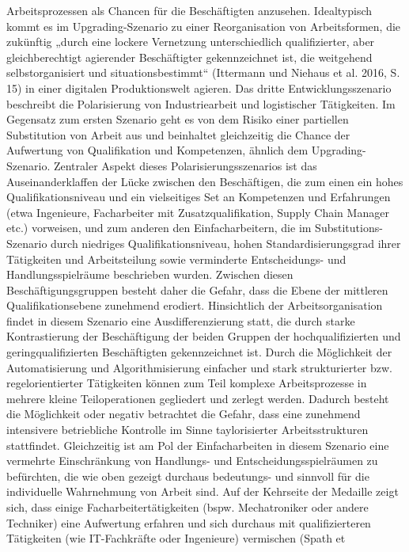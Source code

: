 Arbeitsprozessen als Chancen für die Beschäftigten
anzusehen. Idealtypisch kommt es im Upgrading-Szenario zu einer Reorganisation von Arbeitsformen, die
zukünftig „durch eine lockere Vernetzung unterschiedlich qualifizierter, aber gleichberechtigt agierender Beschäftigter gekennzeichnet ist, die weitgehend
selbstorganisiert und situationsbestimmt“ (Ittermann
und Niehaus et al. 2016, S. 15) in einer digitalen Produktionswelt agieren.
Das dritte Entwicklungsszenario beschreibt die
Polarisierung von Industriearbeit und logistischer Tätigkeiten. Im Gegensatz zum ersten Szenario geht es
von dem Risiko einer partiellen Substitution von Arbeit aus und beinhaltet gleichzeitig die Chance der
Aufwertung von Qualifikation und Kompetenzen,
ähnlich dem Upgrading-Szenario. Zentraler Aspekt
dieses Polarisierungsszenarios ist das Auseinanderklaffen der Lücke zwischen den Beschäftigen, die zum
einen ein hohes Qualifikationsniveau und ein vielseitiges Set an Kompetenzen und Erfahrungen (etwa Ingenieure, Facharbeiter mit Zusatzqualifikation, Supply
Chain Manager etc.) vorweisen, und zum anderen den
Einfacharbeitern, die im Substitutions-Szenario durch
niedriges Qualifikationsniveau, hohen Standardisierungsgrad ihrer Tätigkeiten und Arbeitsteilung sowie
verminderte Entscheidungs- und Handlungsspielräume beschrieben wurden. Zwischen diesen Beschäftigungsgruppen besteht daher die Gefahr, dass die
Ebene der mittleren Qualifikationsebene zunehmend erodiert. Hinsichtlich der Arbeitsorganisation findet
in diesem Szenario eine Ausdifferenzierung statt, die
durch starke Kontrastierung der Beschäftigung der
beiden Gruppen der hochqualifizierten und geringqualifizierten Beschäftigten gekennzeichnet ist.
Durch die Möglichkeit der Automatisierung und Algorithmisierung einfacher und stark strukturierter bzw.
regelorientierter Tätigkeiten können zum Teil komplexe Arbeitsprozesse in mehrere kleine Teiloperationen
gegliedert und zerlegt werden. Dadurch besteht die
Möglichkeit oder negativ betrachtet die Gefahr, dass
eine zunehmend intensivere betriebliche Kontrolle im
Sinne taylorisierter Arbeitsstrukturen stattfindet.
Gleichzeitig ist am Pol der Einfacharbeiten in diesem
Szenario eine vermehrte Einschränkung von Handlungs- und Entscheidungsspielräumen zu befürchten,
die wie oben gezeigt durchaus bedeutungs- und sinnvoll für die individuelle Wahrnehmung von Arbeit
sind. Auf der Kehrseite der Medaille zeigt sich, dass
einige Facharbeitertätigkeiten (bspw. Mechatroniker
oder andere Techniker) eine Aufwertung erfahren und
sich durchaus mit qualifizierteren Tätigkeiten (wie
IT-Fachkräfte oder Ingenieure) vermischen (Spath et
